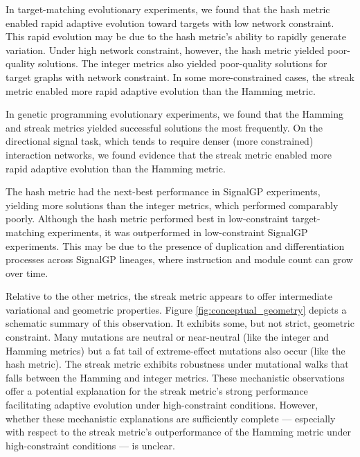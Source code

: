 In target-matching evolutionary experiments, we found that the hash metric enabled rapid adaptive evolution toward targets with low network constraint.
This rapid evolution may be due to the hash metric's ability to rapidly generate variation.
Under high network constraint, however, the hash metric yielded poor-quality solutions.
The integer metrics also yielded poor-quality solutions for target graphs with network constraint.
In some more-constrained cases, the streak metric enabled more rapid adaptive evolution than the Hamming metric.


In genetic programming evolutionary experiments, we found that the Hamming and streak metrics yielded successful solutions the most frequently.
On the directional signal task, which tends to require denser (more constrained) interaction networks, we found evidence that the streak metric enabled more rapid adaptive evolution than the Hamming metric.

The hash metric had the next-best performance in SignalGP experiments, yielding more solutions than the integer metrics, which performed comparably poorly.
Although the hash metric performed best in low-constraint target-matching experiments, it was outperformed in low-constraint SignalGP experiments.
This may be due to the presence of duplication and differentiation processes across SignalGP lineages, where instruction and module count can grow over time.



Relative to the other metrics, the streak metric appears to offer intermediate variational and geometric properties.
Figure \ref{fig:conceptual_geometry} depicts a schematic summary of this observation.
It exhibits some, but not strict, geometric constraint.
Many mutations are neutral or near-neutral (like the integer and Hamming metrics) but a fat tail of extreme-effect mutations also occur (like the hash metric).
The streak metric exhibits robustness under mutational walks that falls between the Hamming and integer metrics.
These mechanistic observations offer a potential explanation for the streak metric's strong performance facilitating adaptive evolution under high-constraint conditions.
However, whether these mechanistic explanations are sufficiently complete --- especially with respect to the streak metric's outperformance of the Hamming metric under high-constraint conditions --- is unclear.
